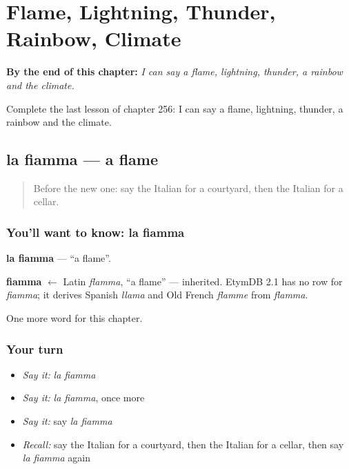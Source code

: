 
\chapter{Flame, Lightning, Thunder, Rainbow, Climate}
\label{ch:it-flame-lightning-thunder-rainbow-climate}

\begin{chapteropening}
\textbf{By the end of this chapter:} \emph{I can say a flame, lightning, thunder, a rainbow and the climate.}

Complete the last lesson of chapter 256: I can say a flame, lightning, thunder, a rainbow and the climate.
\end{chapteropening}

\section[la fiamma]{la fiamma — a flame}

\label{lesson:IT-C256-fiamma}



\begin{quote}
Before the new one: say the Italian for a courtyard, then the Italian for a cellar.
\end{quote}

\subsection*{You'll want to know: la fiamma}
\textbf{la fiamma} — \textquotedblleft{}a flame\textquotedblright{}.

\begin{cousinweb}
\textbf{fiamma} $\leftarrow$ Latin \emph{flamma}, \textquotedblleft{}a flame\textquotedblright{} — inherited. EtymDB 2.1 has no row for \emph{fiamma}; it derives Spanish \emph{llama} and Old French \emph{flamme} from \emph{flamma}.
\end{cousinweb}

\begin{grammarlens}[title={What you've built}]
One more word for this chapter.
\end{grammarlens}

\subsection*{Your turn}
\begin{itemize}
\raggedright
  \item \emph{Say it:} \emph{la fiamma}
  \item \emph{Say it:} \emph{la fiamma}, once more
  \item \emph{Say it:} say \emph{la fiamma}
  \item \emph{Recall:} say the Italian for a courtyard, then the Italian for a cellar, then say \emph{la fiamma} again
\end{itemize}

